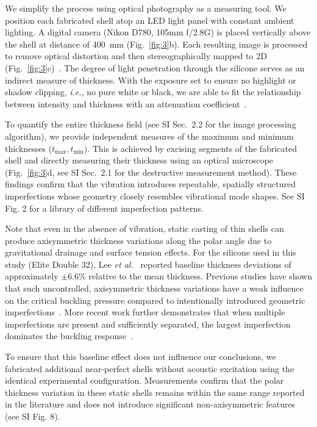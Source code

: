 \documentclass[twocolumn,letter,11pt]{article}
\begin{document}
We simplify the process using optical photography as a measuring tool. We position each fabricated shell atop an LED light panel with constant ambient lighting. A digital camera (Nikon D780, 105mm f/2.8G) is placed vertically above the shell at distance of \SI{400}{\milli\metre} (Fig.~\ref{fig:3}b). Each resulting image is processed to remove optical distortion and then stereographically mapped to 2D (Fig.~\ref{fig:3}c)~\cite{lisle2004stereographic}. The degree of light penetration through the silicone serves as an indirect measure of thickness. With the exposure set to ensure no highlight or shadow clipping, \textit{i.e.}, no pure white or black, we are able to fit the relationship between intensity and thickness with an attenuation coefficient~\cite{baker1984effect}. 

To quantify the entire thickness field (see SI Sec.~2.2 for the image processing algorithm), we provide independent measures of the maximum and minimum thicknesses ($t_\mathrm{max}, t_\mathrm{min}$). This is achieved by excising segments of the fabricated shell and directly measuring their thickness using an optical microscope (Fig.~\ref{fig:3}d, see SI Sec.~2.1 for the destructive measurement method). These findings confirm that the vibration introduces repeatable, spatially structured imperfections whose geometry closely resembles vibrational mode shapes. See SI Fig. 2 for a library of different imperfection patterns.

Note that even in the absence of vibration, static casting of thin shells can produce axisymmetric thickness variations along the polar angle due to gravitational drainage and surface tension effects. 
For the silicone used in this study (Elite Double 32), Lee \textit{et al.}~\cite{lee2016fabrication} reported baseline thickness deviations of approximately $\pm6.6\%$ relative to the mean thickness. 
Previous studies have shown that such uncontrolled, axisymmetric thickness variations have a weak influence on the critical buckling pressure compared to intentionally introduced geometric imperfections~\cite{lee2016geometric}. More recent work further demonstrates that when multiple imperfections are present and sufficiently separated, the largest imperfection dominates the buckling response~\cite{derveni2025defect}.

To ensure that this baseline effect does not influence our conclusions, we fabricated additional near-perfect shells without acoustic excitation using the identical experimental configuration. 
Measurements confirm that the polar thickness variation in these static shells remains within the same range reported in the literature and does not introduce significant non-axisymmetric features (see SI Fig. 8).
\end{document}
